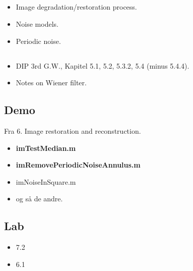 \subsection{\subtopics}

\begin{itemize}
	\item Image degradation/restoration process.
	\item Noise models.
	\item Periodic noise.
\end{itemize}

\subsection{\curriculum}

\begin{itemize}
	\item DIP 3rd G.W., Kapitel 5.1, 5.2, 5.3.2, 5.4 (minus 5.4.4).
	\item Notes on Wiener filter.
\end{itemize}

\subsection{Demo}

Fra 6. Image restoration and reconstruction.

\begin{itemize}
	\item \textbf{imTestMedian.m}
	\item \textbf{imRemovePeriodicNoiseAnnulus.m}
	\item imNoiseInSquare.m
	\item og så de andre.
\end{itemize}

\subsection{Lab}

\begin{itemize}
	\item 7.2
	\item 6.1
\end{itemize}
